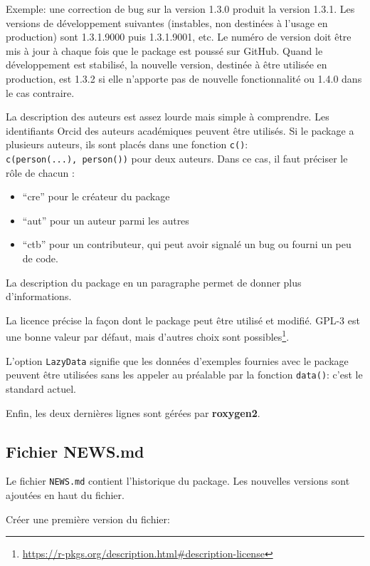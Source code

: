 \documentclass[
  12pt,
  french,
  a4paper,
  extrafontsizes,onecolumn,openright
  ]{memoir}
\providecommand{\tightlist}{%
  \setlength{\itemsep}{0pt}\setlength{\parskip}{0pt}}
\begin{document}
Exemple: une correction de bug sur la version 1.3.0 produit la version 1.3.1.
Les versions de développement suivantes (instables, non destinées à l'usage en production) sont 1.3.1.9000 puis 1.3.1.9001, etc.
Le numéro de version doit être mis à jour à chaque fois que le package est poussé sur GitHub.
Quand le développement est stabilisé, la nouvelle version, destinée à être utilisée en production, est 1.3.2 si elle n'apporte pas de nouvelle fonctionnalité ou 1.4.0 dans le cas contraire.

La description des auteurs est assez lourde mais simple à comprendre.
Les identifiants Orcid des auteurs académiques peuvent être utilisés.
Si le package a plusieurs auteurs, ils sont placés dans une fonction \texttt{c()}: \texttt{c(person(...),\ person())} pour deux auteurs.
Dans ce cas, il faut préciser le rôle de chacun :

\begin{itemize}
\tightlist
\item
  \enquote{cre} pour le créateur du package
\item
  \enquote{aut} pour un auteur parmi les autres
\item
  \enquote{ctb} pour un contributeur, qui peut avoir signalé un bug ou fourni un peu de code.
\end{itemize}

La description du package en un paragraphe permet de donner plus d'informations.

La licence précise la façon dont le package peut être utilisé et modifié.
GPL-3 est une bonne valeur par défaut, mais d'autres choix sont possibles\footnote{\url{https://r-pkgs.org/description.html\#description-license}}.

L'option \texttt{LazyData} signifie que les données d'exemples fournies avec le package peuvent être utilisées sans les appeler au préalable par la fonction \texttt{data()}: c'est le standard actuel.

Enfin, les deux dernières lignes sont gérées par \textbf{roxygen2}.

\hypertarget{fichier-news.md}{%
\subsection{Fichier NEWS.md}\label{fichier-news.md}}

Le fichier \texttt{NEWS.md} contient l'historique du package.
Les nouvelles versions sont ajoutées en haut du fichier.

Créer une première version du fichier:
\end{document}
